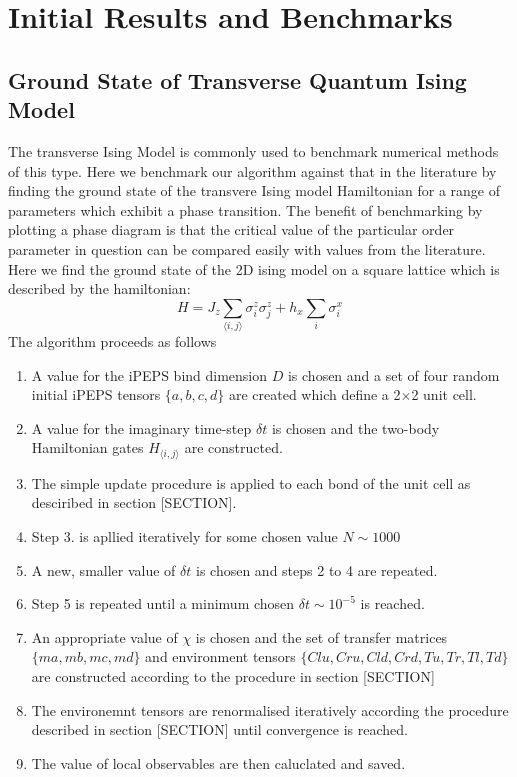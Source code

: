 \documentclass[10pt,twocolumn]{article}
\begin{document}
\section{Initial Results and Benchmarks}

\subsection{Ground State of Transverse Quantum Ising Model}
The transverse Ising Model is commonly used to benchmark numerical methods of this type. Here we benchmark our algorithm against that in the literature by finding the ground state of the transvere Ising model Hamiltonian for a range of parameters which exhibit a phase transition. The benefit of benchmarking by plotting a phase diagram is that the critical value of the particular order parameter in question can be compared easily with values from the literature. Here we find the ground state of the 2D ising model on a square lattice which is described by the hamiltonian:
 \begin{equation}
 H = J_z \sum_{\langle i,j \rangle} \sigma_i^z \sigma_j^z + h_x \sum_{i} \sigma_i^x
 \end{equation}
 The algorithm proceeds as follows 
 
\begin{enumerate}
\item A value for the iPEPS bind dimension $D$ is chosen and a set of four random initial iPEPS tensors $\{a,b,c,d\}$ are created which define a 2$\times$2 unit cell.
\item A value for the imaginary time-step $\delta t$ is chosen and the two-body Hamiltonian gates $H_{\langle i,j \rangle}$ are constructed.  
\item The simple update procedure is applied to each bond of the unit cell as desciribed in section [SECTION]. 
\item Step 3. is apllied iteratively for some chosen value $N \sim 1000$
\item A new, smaller value of $\delta t$ is chosen and steps 2 to 4 are repeated.  
\item Step 5 is repeated until a minimum chosen $\delta t \sim 10^{-5}$ is reached. 
\item An appropriate value of $\chi$ is chosen and the set of transfer matrices $\{ma, mb, mc,md\}$ and environment tensors $\{Clu,Cru,Cld,Crd, Tu,Tr,Tl,Td\}$  are constructed according to the procedure in section [SECTION]
\item The environemnt tensors are renormalised iteratively according the procedure described in section [SECTION] until convergence is reached. 
\item The value of local observables are then caluclated and saved.
\end{enumerate}
\end{document}
